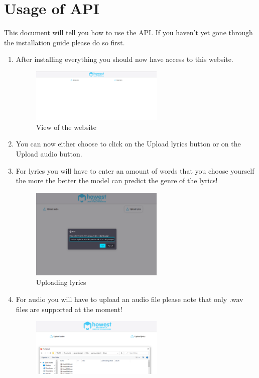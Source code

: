 \documentclass{article}
\begin{document}
\section{Usage of API}
This document will tell you how to use the API. 
If you haven't yet gone through the installation guide please do so first.
\begin{enumerate}
    \item After installing everything you should now have access to this website.
    \begin{figure}[H]
        \centering
        \includegraphics[width=0.6\textwidth]{website.PNG}
        \caption{View of the website}
    \end{figure}
    \item You can now either choose to click on the Upload lyrics button or on the Upload audio button.
    \item For lyrics you will have to enter an amount of words that you choose yourself the more the better the model can predict the genre of the lyrics!
    \begin{figure}[H]
        \centering
        \includegraphics[width=0.6\textwidth]{lyricsmodel.PNG}
        \caption{Uploading lyrics}
    \end{figure}
    \item For audio you will have to upload an audio file please note that only .wav files are supported at the moment!
    \begin{figure}[H]
        \centering
        \includegraphics[width=0.6\textwidth]{audiomodel.PNG}

\end{figure}
\end{enumerate}
\end{document}
